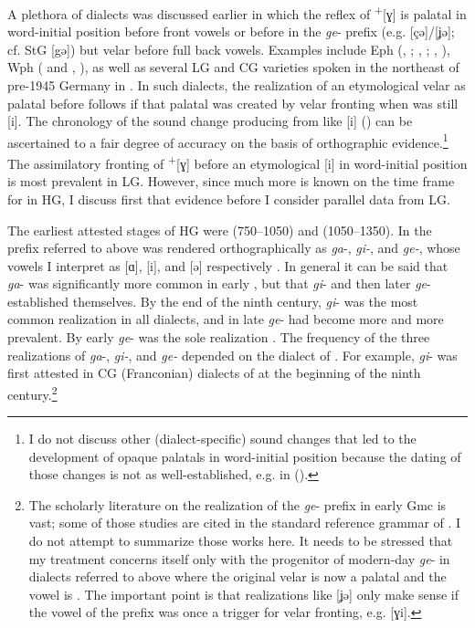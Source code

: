 A plethora of dialects was discussed earlier in which the reflex of  \textsuperscript{+}[ɣ] is palatal in word-initial position before front vowels or before  in the \textit{ge}{}- prefix (e.g. [çə]/[ʝə]; cf. StG [gə]) but velar before full back vowels. Examples include Eph (, ; , ; , ), Wph ( and , ), as well as several LG and CG varieties spoken in the northeast of pre-1945 Germany in . In such dialects, the realization of an etymological velar as palatal before  follows if that palatal was created by velar fronting when  was still [i]. The chronology of the sound change producing  from  like [i] () can be ascertained to a fair degree of accuracy on the basis of orthographic evidence.\footnote{{I do not discuss other (dialect-specific) sound changes that led to the development of opaque palatals in word-initial position because the dating of those changes is not as well-established, e.g.  in  ().} } The assimilatory fronting of  \textsuperscript{+}[ɣ] before an etymological [i] in word-initial position is most prevalent in LG. However, since much more is known on the time frame for  in HG, I discuss first that evidence before I consider parallel data from LG.\largerpage[2]

The earliest attested stages of HG were  (750–1050) and  (1050–1350). In  the prefix referred to above was rendered orthographically as \textit{ga}{}-, \textit{gi-}, and \textit{ge-}, whose vowels I interpret as [ɑ], [i], and [ə] respectively \citep[73--74]{Braune2004}. In general it can be said that \textit{ga}{}- was significantly more common in early , but that \textit{gi}{}- and then later \textit{ge}{}- established themselves. By the end of the ninth century, \textit{gi}{}- was the most common realization in all  dialects, and in late  \textit{ge}{}- had become more and more prevalent. By early  \textit{ge}{}- was the sole realization \citep[108]{Paul2007}. The frequency of the three realizations of \textit{ga}{}-, \textit{gi-}, and  \textit{ge-} depended on the dialect of . For example, \textit{gi}{}- was first attested in CG (Franconian) dialects of  at the beginning of the ninth century.\footnote{{The scholarly literature on the realization of the} \textrm{\textit{ge}}\textrm{{}- prefix in early Gmc is vast; some of those studies are cited in the standard reference grammar of  \citep[73--74]{Braune2004}. I do not attempt to summarize those works here. It needs to be stressed that my treatment concerns itself only with the  progenitor of modern-day} \textrm{\textit{ge}}\textrm{{}- in dialects referred to above where the original velar is now a palatal and the vowel is . The important point is that realizations like [ʝə] only make sense if the vowel of the prefix was once a trigger for velar fronting, e.g. [ɣi].}}

